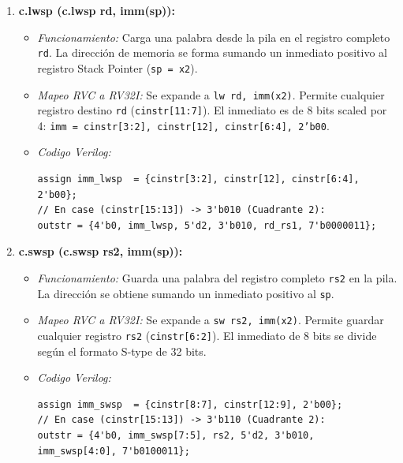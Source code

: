 \documentclass[12pt, a4paper]{article}
\begin{document}
\begin{enumerate}
    \item \textbf{c.lwsp (c.lwsp rd, imm(sp)):}
    \begin{itemize}
        \item \textit{Funcionamiento:} Carga una palabra desde la pila en el registro completo \texttt{rd}. La dirección de memoria se forma sumando un inmediato positivo al registro Stack Pointer (\texttt{sp = x2}).
        \item \textit{Mapeo RVC a RV32I:} Se expande a \texttt{lw rd, imm(x2)}. Permite cualquier registro destino \texttt{rd} (\texttt{cinstr[11:7]}). El inmediato es de 8 bits scaled por 4: \texttt{imm = {cinstr[3:2], cinstr[12], cinstr[6:4], 2'b00}}.
        \item \textit{Codigo Verilog:}
        \begin{lstlisting}[style=verilogstyle]
assign imm_lwsp  = {cinstr[3:2], cinstr[12], cinstr[6:4], 2'b00};
// En case (cinstr[15:13]) -> 3'b010 (Cuadrante 2):
outstr = {4'b0, imm_lwsp, 5'd2, 3'b010, rd_rs1, 7'b0000011};
        \end{lstlisting}
    \end{itemize}

    \item \textbf{c.swsp (c.swsp rs2, imm(sp)):}
    \begin{itemize}
        \item \textit{Funcionamiento:} Guarda una palabra del registro completo \texttt{rs2} en la pila. La dirección se obtiene sumando un inmediato positivo al \texttt{sp}.
        \item \textit{Mapeo RVC a RV32I:} Se expande a \texttt{sw rs2, imm(x2)}. Permite guardar cualquier registro \texttt{rs2} (\texttt{cinstr[6:2]}). El inmediato de 8 bits se divide según el formato S-type de 32 bits.
        \item \textit{Codigo Verilog:}
        \begin{lstlisting}[style=verilogstyle]
assign imm_swsp  = {cinstr[8:7], cinstr[12:9], 2'b00};
// En case (cinstr[15:13]) -> 3'b110 (Cuadrante 2):
outstr = {4'b0, imm_swsp[7:5], rs2, 5'd2, 3'b010, imm_swsp[4:0], 7'b0100011};
        \end{lstlisting}
    \end{itemize}


\end{enumerate}
\end{document}
